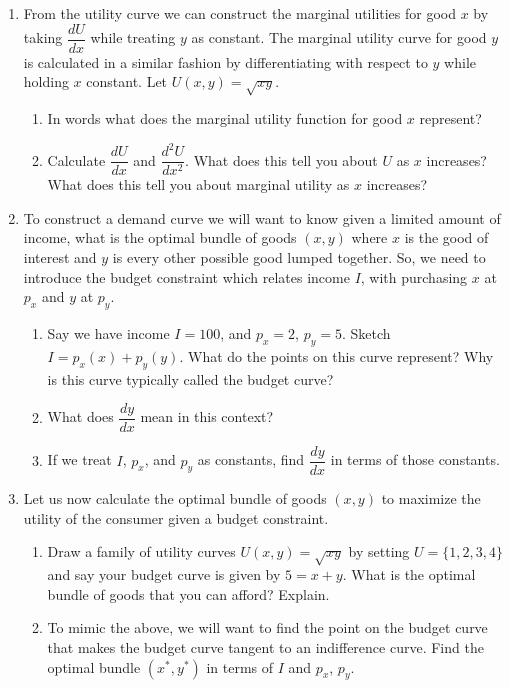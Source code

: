 \documentclass{amsbook}
\begin{document}
\begin{enumerate}
\begin{enumerate}
		\end{enumerate}
	\item From the utility curve we can construct the marginal utilities for good $x$ by taking $\dfrac{dU}{dx}$ while treating $y$ as constant. The marginal utility curve for good $y$ is calculated in a similar fashion by differentiating with respect to $y$ while holding $x$ constant. Let $U(x,y)=\sqrt{xy}$.
		\begin{enumerate}
			\item In words what does the marginal utility function for good $x$ represent?
			\item Calculate $\dfrac{dU}{dx}$ and $\dfrac{d^2 U}{dx^2}$. What does this tell you about $U$ as $x$ increases? What does this tell you about marginal utility as $x$ increases?
			
		\end{enumerate}
	\item To construct a demand curve we will want to know given a limited amount of income, what is the optimal bundle of goods $(x,y)$ where $x$ is the good of interest and $y$ is every other possible good lumped together. So, we need to introduce the budget constraint which relates income $I$, with purchasing $x$ at $p_x$ and $y$ at $p_y$.
		\begin{enumerate}
			\item Say we have income $I=100$, and $p_x=2$, $p_y=5$. Sketch $I=p_x(x)+p_y(y)$. What do the points on this curve represent? Why is this curve typically called the budget curve?
			\item What does $\dfrac{dy}{dx}$ mean in this context?
			\item If we treat $I$, $p_x$, and $p_y$ as constants, find $\dfrac{dy}{dx}$ in terms of those constants. 
		\end{enumerate}
		\item Let us now calculate the optimal bundle of goods $(x,y)$ to maximize the utility of the consumer given a budget constraint.
			\begin{enumerate}
				\item Draw a family of utility curves $U(x,y)=\sqrt{xy}$ by setting $U=\{1, 2, 3, 4\}$ and say your budget curve is given by $5=x+y$. What is the optimal bundle of goods that you can afford? Explain.
				\item To mimic the above, we will want to find the point on the budget curve that makes the budget curve tangent to an indifference curve. Find the optimal bundle $(x^*,y^*)$ in terms of $I$ and $p_x$, $p_y$.

\end{enumerate}
\end{enumerate}
\end{document}
